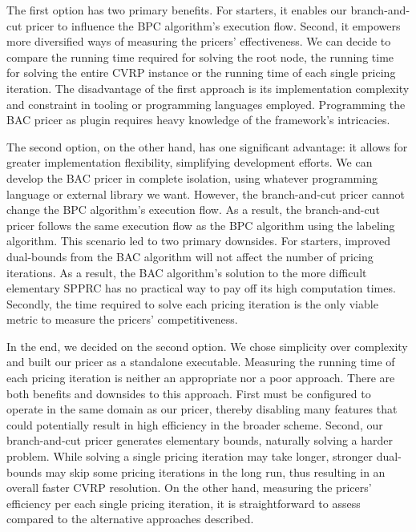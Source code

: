 The first option has two primary benefits.
For starters, it enables our branch-and-cut pricer to influence the BPC algorithm's execution flow.
Second, it empowers more diversified ways of measuring the pricers' effectiveness.
We can decide to compare
the running time required for solving the root node, the running time for solving the entire CVRP instance
or the running time of each single pricing iteration.
The disadvantage of the first approach is its implementation complexity
and constraint in tooling or programming languages employed.
Programming the BAC pricer as plugin requires heavy knowledge of the \bapcod{} framework's intricacies.

The second option, on the other hand, has one significant advantage:
it allows for greater implementation flexibility, simplifying development efforts.
We can develop the BAC pricer in complete isolation,
using whatever programming language or external library we want.
However, the branch-and-cut pricer cannot change the BPC algorithm's execution flow.
As a result, the branch-and-cut pricer follows the same execution flow
as the BPC algorithm  using the labeling algorithm.
This scenario led to two primary downsides.
For starters, improved dual-bounds from the BAC algorithm
will not affect the number of pricing iterations.
As a result, the BAC algorithm's solution to the more difficult elementary SPPRC
has no practical way to pay off its high computation times.
Secondly, the time required to solve each pricing iteration
is the only viable metric to measure the pricers' competitiveness.

\medskip

In the end, we decided on the second option.
We chose simplicity over complexity and built our pricer as a standalone executable.
Measuring the running time of each pricing iteration is neither an appropriate nor a poor approach.
There are both benefits and downsides to this approach.
First \bapcod{} must be configured to operate in the same domain as our pricer,
thereby disabling many features that could potentially result in high efficiency in the broader scheme.
Second, our branch-and-cut pricer generates elementary bounds, naturally solving a harder problem.
While solving a single pricing iteration may take longer,
stronger dual-bounds may skip some pricing iterations in the long run,
thus resulting in an overall faster CVRP resolution.
On the other hand, measuring the pricers' efficiency per each single pricing iteration,
it is straightforward to assess compared to the alternative approaches described.

